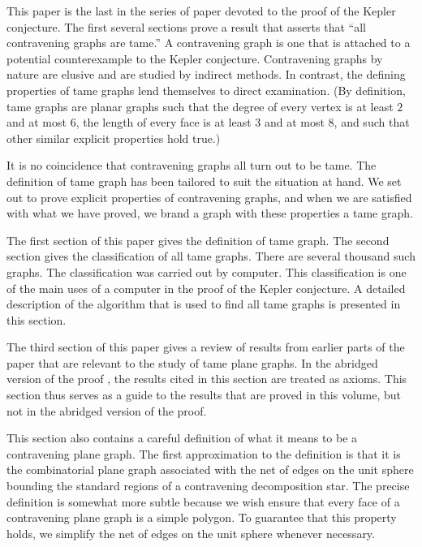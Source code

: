 
This paper is the last in the series of paper devoted to the proof
of the Kepler conjecture.  The first several sections prove a result
that asserts that ``all contravening graphs are tame.''  A
contravening graph is one that is attached to a potential
counterexample to the Kepler conjecture.  Contravening graphs by
nature are elusive and are studied by indirect methods. In contrast,
the defining properties of tame graphs lend themselves to direct
examination.  (By definition, tame graphs are planar graphs such
that the degree of every vertex is at least $2$ and at most $6$, the
length of every face is at least $3$ and at most $8$, and such that
other similar explicit properties hold true.)

It is no coincidence that contravening graphs all turn out to be
tame.  The definition of tame graph has been tailored to suit the
situation at hand.  We set out to prove explicit properties of
contravening graphs, and when we are satisfied with what we have
proved, we brand a graph with these properties a tame graph.

The first section of this paper gives the definition of tame graph.
The second section gives the classification of all tame graphs.
There are several thousand such graphs.  The classification was
carried out by computer.  This classification is one of the main
uses of a computer in the proof of the Kepler conjecture.  A
detailed description of the algorithm that is used to find all tame
graphs is presented in this section.

The third section of this paper gives a review of results from
earlier parts of the paper that are relevant to the study of tame
plane graphs.  In the abridged version of the proof \cite{KC}, the
results cited in this section are treated as axioms. This section
thus serves as a guide to the results that are proved in this
volume, but not in the abridged version of the proof.

This section also contains a careful definition of what it means to
be a contravening plane graph.  The first approximation to the
definition is that it is the combinatorial plane graph associated
with the net of edges on the unit sphere bounding the standard
regions of a contravening decomposition star. The precise definition
is somewhat more subtle because we wish ensure that every face of a
contravening plane graph is a simple polygon. To guarantee that this
property holds, we simplify the net of edges on the unit sphere
whenever necessary.


